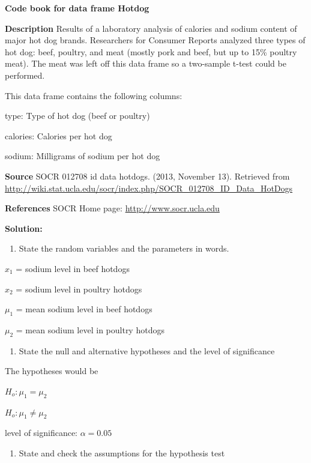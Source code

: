 \documentclass[]{book}
\providecommand{\tightlist}{%
  \setlength{\itemsep}{0pt}\setlength{\parskip}{0pt}}
\begin{document}
\textbf{Code book for data frame Hotdog}

\textbf{Description}
Results of a laboratory analysis of calories and sodium content of major hot dog brands. Researchers for Consumer Reports analyzed three types of hot dog: beef, poultry, and meat (mostly pork and beef, but up to 15\% poultry meat). The meat was left off this data frame so a two-sample t-test could be performed.

This data frame contains the following columns:

type: Type of hot dog (beef or poultry)

calories: Calories per hot dog

sodium: Milligrams of sodium per hot dog

\textbf{Source}
SOCR 012708 id data hotdogs. (2013, November 13). Retrieved from
\url{http://wiki.stat.ucla.edu/socr/index.php/SOCR_012708_ID_Data_HotDogs}

\textbf{References}
SOCR Home page: \url{http://www.socr.ucla.edu}

\textbf{Solution:}

\begin{enumerate}
\def\labelenumi{\arabic{enumi}.}
\tightlist
\item
  State the random variables and the parameters in words.
\end{enumerate}

\(x_1\) = sodium level in beef hotdogs

\(x_2\) = sodium level in poultry hotdogs

\(\mu_1\) = mean sodium level in beef hotdogs

\(\mu_2\) = mean sodium level in poultry hotdogs

\begin{enumerate}
\def\labelenumi{\arabic{enumi}.}
\setcounter{enumi}{1}
\tightlist
\item
  State the null and alternative hypotheses and the level of
  significance
\end{enumerate}

The hypotheses would be

\(H_o:\mu_1=\mu_2\)

\(H_o:\mu_1\ne \mu_2\)

level of significance: \(\alpha=0.05\)

\begin{enumerate}
\def\labelenumi{\arabic{enumi}.}
\setcounter{enumi}{2}
\tightlist
\item
  State and check the assumptions for the hypothesis test
\end{enumerate}
\end{document}
